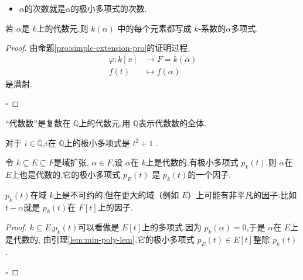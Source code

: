 \documentclass[lang=cn,12pt,color=green,fontset=none,pad]{elegantbook}
\begin{document}
\begin{remark}
    \begin{itemize}
        \item  \(  \alpha  \)的次数就是\(  \alpha  \)的极小多项式的次数.     
    \end{itemize}
    
\end{remark}

\begin{proposition}
    若 \(  \alpha  \)是 \(  k  \)上的代数元,则 \(  k\left( \alpha \right)   \)   中的每个元素都写成 \(  k  \)-系数的\(  \alpha  \)多项式.  
\end{proposition}
\begin{proof}
  由命题\ref{pro:simple-extension-pro}的证明过程,  \[
    \begin{aligned}
        \varphi:k[x]& \to F=k\left( \alpha \right) \\ 
          f\left( t \right)& \mapsto f\left( \alpha \right)  
    \end{aligned}
    \]是满射.

    \hfill $\square$
\end{proof}

\begin{example}
    “代数数”是复数在 \(  \mathbb{Q}   \)上的代数元,用 \(  \overline{\mathbb{Q} }  \)表示代数数的全体.
    
    对于 \(  i \in \overline{\mathbb{Q} }  \),\(  i  \)在 \(  \mathbb{Q}   \)上的极小多项式是 \(  t^{2}+ 1  \)    .
\end{example}

\begin{proposition}\label{min-poly-division}
    令 \(  k\subseteq E\subseteq F  \)是域扩张, \(  \alpha \in F  \),设 \(  \alpha  \)在 \(  k  \)上是代数的,有极小多项式 \(  p_{k}\left( t \right)   \).则 \(  \alpha  \)在 \(  E  \)上也是代数的,它的极小多项式 \(  p_{E}\left( t \right)   \)   是 \(  p_{k}\left( t \right)   \)的一个因子. 
\end{proposition}
\begin{remark}
    \(  p_{k}\left( t \right)   \)在域 \(  k  \)上是不可约的,但在更大的域（例如 \(  E  \)）上可能有非平凡的因子.比如 \(  t-\alpha  \)就是 \(  p_{k}\left( t \right)   \)在 \(  F  [t]\)上的因子.      
\end{remark}

\begin{proof}
    \(  k\subseteq E  \),\(  p_{k}\left( t \right)   \)可以看做是 \(  E[t]  \)上的多项式.因为 \(  p_{k}\left( \alpha \right)=0   \),于是 \(  \alpha  \)在 \(  E  \)上是代数的,
    由引理\ref{lem:min-poly-lem},它的极小多项式 \(  p_{E}\left( t \right)\in E[t]   \)整除 \(  p_{k}\left( t \right)   \) .

    \hfill $\square$
\end{proof}
\end{document}
